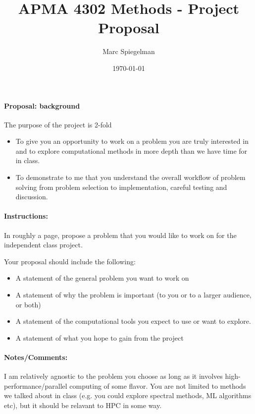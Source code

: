 \documentclass[12pt]{article}
\begin{document}
\title{APMA 4302 Methods - Project Proposal}
\author{Marc Spiegelman}
\date{\today}
\maketitle

\paragraph{Proposal: background} The purpose of the project is 2-fold

\begin{itemize}
  \item To give you an opportunity to work on a problem you are truly interested in and to explore computational methods in more depth than we have time for in class.
  \item To demonstrate to me that you understand the overall workflow of problem solving from problem selection to implementation, careful testing and discussion.
\end{itemize}

\paragraph{Instructions:} In roughly a page, propose a problem that you would like to work on for the independent class project.

Your proposal should include the following:

\begin{itemize}
  \item A  statement of the general problem you want to work on
  \item A  statement of why the problem is important (to you or to a larger audience, or both)
  \item A  statement of the computational tools you expect to use or want to explore.
  \item  A  statement of what you hope to gain from the project
\end{itemize}

\paragraph{Notes/Comments:} I am relatively agnostic to the problem you choose as long as it involves high-performance/parallel computing of some flavor.
You are not limited to methods we talked about in class (e.g. you could explore spectral methods, ML algorithms etc), but it should be relavant to HPC in some way.
\end{document}
